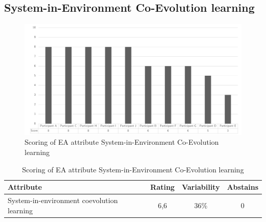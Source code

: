 \subsection{System-in-Environment Co-Evolution learning}
\begin{figure}[H]
	\centering
	\includegraphics[width=0.9\linewidth]{images/scoreeasysteminenvironmentcoevolution}
	\caption[Scoring of EA attribute System-in-Environment Co-Evolution learning]{Scoring of EA attribute System-in-Environment Co-Evolution learning}
	\label{fig:appscoringeasysteminenvironmentcoevolutionlearning}
\end{figure}
\begin{table}[H]
	\centering
	\begin{tabular}{p{}ccc}
		\toprule
		\textbf{Attribute} & \textbf{Rating} & \textbf{Variability} & \textbf{Abstains} \\
		\midrule
		System-in-environment coevolution learning & 6,6 & 36\% & 0 \\%
		\bottomrule
	\end{tabular}%
	\caption[Scoring of EA attribute System-in-Environment Co-Evolution learning]{Scoring of EA attribute System-in-Environment Co-Evolution learning}
	\label{tab:appscoringeasysteminenvironmentcoevolutionlearning}%
\end{table}%
\newpage
